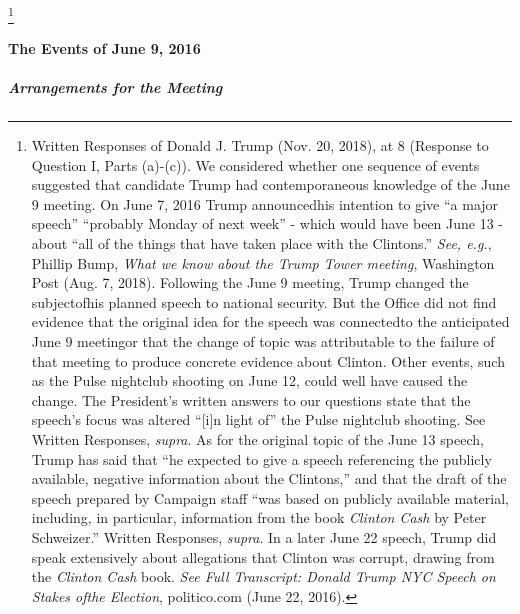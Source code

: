 \footnote{Written Responses of Donald J. Trump (Nov. 20, 2018), at 8 (Response to Question I, Parts (a)-(c)). 
We considered whether one sequence of events suggested that candidate Trump had contemporaneous knowledge of the June 9 meeting. 
On June 7, 2016 Trump announcedhis intention to give “a major speech” “probably Monday of next week” - which would have been June 13 - about “all of the things that have taken place with the Clintons.” 
\textit{See, e.g.}, Phillip Bump, \textit{What we know about the Trump Tower meeting}, Washington Post (Aug. 7, 2018). 
Following the June 9 meeting, Trump changed the subjectofhis planned speech to national security. 
But the Office did not find evidence that the original idea for the speech was connectedto the anticipated June 9 meetingor that the change of topic was attributable to the failure of that meeting to produce concrete evidence about Clinton. 
Other events, such as the Pulse nightclub shooting on June 12, could well have caused the change. 
The President’s written answers to our questions state that the speech’s focus was altered “[i]n light of” the Pulse nightclub shooting. 
See Written Responses, \textit{supra}. 
As for the original topic of the June 13 speech, Trump has said that “he expected to give a speech referencing the publicly available, negative information about the Clintons,” and that the draft of the speech prepared by Campaign staff “was based on publicly available material, including, in particular, information from the book \textit{Clinton Cash} by Peter Schweizer.” 
Written Responses, \textit{supra}. 
In a later June 22 speech, Trump did speak extensively about allegations that Clinton was corrupt, drawing from the \textit{Clinton Cash} book. 
\textit{See Full Transcript: Donald Trump NYC Speech on Stakes ofthe Election}, politico.com (June 22, 2016).}

\paragraph{The Events of June 9, 2016}

\subparagraph{Arrangements for the Meeting}

